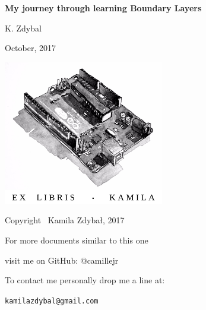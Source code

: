 \documentclass[12pt]{article}
\begin{document}
\begin{titlepage}
    \begin{center}

		\vspace*{6cm}
        \LARGE     
		
        \Huge
        \textbf{My journey through learning Boundary Layers}
        
        \vspace*{1cm}
        


        \vspace{2cm}
        
        \LARGE
        K. Zdybal

        \vspace{6cm}
		\Large

		\vspace{1cm}

 		October, 2017
	\end{center}
\end{titlepage}



\thispagestyle{empty}
\begin{center}
    
\vspace*{4cm}

\includegraphics[width = 70mm]{arduino_dwg.jpg}

\vspace*{2cm}

Copyright \textcopyright \, Kamila Zdybał, 2017

For more documents similar to this one 

visit me on GitHub: @camillejr

To contact me personally drop me a line at:

\verb|kamilazdybal@gmail.com|

\end{center}
\newpage
\end{document}
